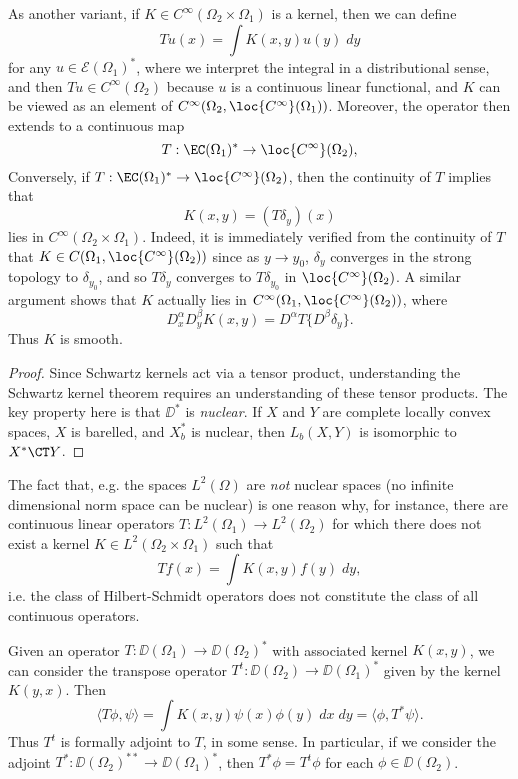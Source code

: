 \begin{remark}
    As another variant, if $K \in C^\infty(\Omega_2 \times \Omega_1)$ is a kernel, then we can define
    \[ Tu(x) = \int K(x,y) u(y)\; dy \]
    for any $u \in \mathcal{E}(\Omega_1)^*$, where we interpret the integral in a distributional sense, and then $Tu \in C^\infty(\Omega_2)$ because $u$ is a continuous linear functional, and $K$ can be viewed as an element of $C^\infty(\Omega_2, \loc{C^\infty}(\Omega_1))$. Moreover, the operator then extends to a continuous map
    \[ T: \EC(\Omega_1)^* \to \loc{C^\infty}(\Omega_2), \]
    Conversely, if $T: \EC(\Omega_1)^* \to \loc{C^\infty}(\Omega_2)$, then the continuity of $T$ implies that
    \[ K(x,y) = (T \delta_y)(x) \]
    lies in $C^\infty(\Omega_2 \times \Omega_1)$. Indeed, it is immediately verified from the continuity of $T$ that $K \in C(\Omega_1, \loc{C^\infty}(\Omega_2))$ since as $y \to y_0$, $\delta_y$ converges in the strong topology to $\delta_{y_0}$, and so $T \delta_y$ converges to $T \delta_{y_0}$ in $\loc{C^\infty}(\Omega_2)$. A similar argument shows that $K$ actually lies in $C^\infty(\Omega_1, \loc{C^\infty}(\Omega_2))$, where
    \[ D^\alpha_x D^\beta_y K(x,y) = D^\alpha T \{ D^\beta \delta_y \}. \]
    Thus $K$ is smooth.
\end{remark}

\begin{proof}
    Since Schwartz kernels act via a tensor product, understanding the Schwartz kernel theorem requires an understanding of these tensor products. The key property here is that $\DD^*$ is \emph{nuclear}. If $X$ and $Y$ are complete locally convex spaces, $X$ is barelled, and $X^*_b$ is nuclear, then $L_b(X,Y)$ is isomorphic to $X^* \CT Y$.
\end{proof}

\begin{remark}
    The fact that, e.g. the spaces $L^2(\Omega)$ are \emph{not} nuclear spaces (no infinite dimensional norm space can be nuclear) is one reason why, for instance, there are continuous linear operators $T: L^2(\Omega_1) \to L^2(\Omega_2)$ for which there does not exist a kernel $K \in L^2(\Omega_2 \times \Omega_1)$ such that
    \[ Tf(x) = \int K(x,y) f(y)\; dy, \]
    i.e. the class of Hilbert-Schmidt operators does not constitute the class of all continuous operators.
\end{remark}

Given an operator $T: \DD(\Omega_1) \to \DD(\Omega_2)^*$ with associated kernel $K(x,y)$, we can consider the transpose operator $T^t: \DD(\Omega_2) \to \DD(\Omega_1)^*$ given by the kernel $K(y,x)$. Then
%
\[ \langle T\phi, \psi \rangle = \int K(x,y) \psi(x) \phi(y)\; dx\; dy = \langle \phi, T^* \psi \rangle. \]
%
Thus $T^t$ is formally adjoint to $T$, in some sense. In particular, if we consider the adjoint $T^*: \DD(\Omega_2)^{**} \to \DD(\Omega_1)^*$, then $T^* \phi = T^t \phi$ for each $\phi \in \DD(\Omega_2)$.

